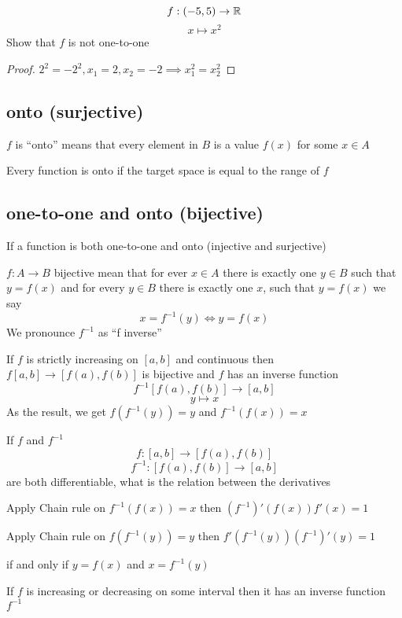 \begin{example*}
  $$f: (-5, 5) \to \mathbb R$$
  $$x \mapsto x^2$$
  Show that $f$ is not one-to-one
\end{example*}

\begin{proof}
  $2^2 = -2^2, x_1 = 2, x_2 = -2 \implies x_1^2 = x_2^2$
\end{proof}

\subsection{onto (surjective)}
$f$ is ``onto'' means that every element in $B$ is a value $f(x)$ for some $x \in A$

Every function is onto if the target space is equal to the range of $f$

\subsection{one-to-one and onto (bijective)}
If a function is both one-to-one and onto (injective and surjective) 

$f : A \to B$ bijective mean that for ever $x \in A$ there is exactly one $y \in B$ such that $y = f(x)$
and for every $y \in B$ there is exactly one $x$, such that $y = f(x)$
we say $$x = f^{-1}(y) \iff y = f(x)$$
We pronounce $f^{-1}$ as ``f inverse'' 


\begin{theorem*}
  If $f$ is strictly increasing on $[a, b]$ and continuous then $f[a, b] \to [f(a), f(b)]$ is bijective and $f$ has an inverse function
  $$f^{-1}[f(a), f(b)] \to [a, b]$$
  $$y \mapsto x$$
  As the result, we get $f(f^{-1}(y)) = y$ and $f^{-1}(f(x)) = x$
\end{theorem*}


If $f$ and $f^{-1}$
$$f: [a, b] \to [f(a), f(b)]$$
$$f^{-1} : [f(a), f(b)] \to [a, b]$$
are both differentiable, what is the relation between the derivatives

Apply Chain rule on $f^{-1}(f(x)) = x$ then $(f^{-1})'(f(x))f'(x) = 1$

Apply Chain rule on $f(f^{-1}(y)) = y$ then $f'(f^{-1}(y))(f^{-1})'(y) = 1$

if and only if $y = f(x)$ and $x = f^{-1}(y)$

\begin{theorem*}
  If $f$ is increasing or decreasing on some interval then it has an inverse function $f^{-1}$
\end{theorem*}

